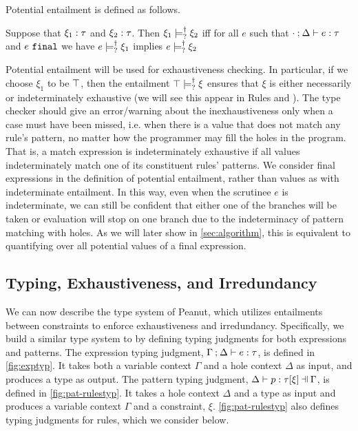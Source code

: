 Potential entailment is defined as follows.
\begin{definition}
  \label{definition:nn-entailment}
  Suppose that $\xi_1 : \tau$ and $\xi_2 : \tau$. Then $\xi_1 \models_{?}^{\dag} \xi_2$ iff for all $e$ such that $\cdot \mathbin{;} \Delta \vdash e : \tau$ and $e ~\mathtt{final}$ we have $e \models_{?}^{\dag} \xi_1$ implies $e \models_{?}^{\dag} \xi_2$ 
\end{definition}
Potential entailment will be used for exhaustiveness checking. In particular, if we choose $\xi_1$ to be $\top$, then the entailment $\top \models_{?}^{\dag} \xi$ ensures that $\xi$ is either necessarily or indeterminately exhaustive (we will see this appear in Rules \TMatchZPre and \TMatchNZPre). 
The type checker should give an error/warning about the inexhaustiveness only when a case must have been missed, i.e. when there is a value that does not match any rule's pattern, no matter how the programmer may fill the holes in the program. That is, a match expression is indeterminately exhaustive if all values indeterminately match one of its constituent rules' patterns.
We consider final expressions in the definition of potential entailment, rather than values as with indeterminate entailment. 
In this way, even when the scrutinee $e$ is indeterminate, we can still be confident that either one of the branches will be taken or evaluation will stop on one branch due to the indeterminacy of pattern matching with holes. As we will later show in \autoref{sec:algorithm}, this is equivalent to quantifying over all potential values of a final expression.


\subsection{Typing, Exhaustiveness, and Irredundancy}\label{sec:statics}



We can now describe the type system of Peanut, which utilizes entailments between constraints to enforce exhaustiveness and irredundancy.
  Specifically, we build a similar type system to
\cite{DBLP:journals/pacmpl/OmarVCH19} by defining typing judgments for both
expressions and patterns. The expression typing judgment, $\Gamma \mathbin{;} \Delta \vdash e : \tau$, is defined in \autoref{fig:exptyp}. It takes both a variable context $\Gamma$ and a hole context $\Delta$ as input, and produces a type as output. The pattern typing judgment, $\chpattyp{p}{\tau}{\xi}{\Gamma}{\Delta}$, is defined in \autoref{fig:pat-rulestyp}. It takes a hole context $\Delta$ and a type as input and produces a variable context $\Gamma$ and a constraint, $\xi$. \autoref{fig:pat-rulestyp} also defines typing judgments for rules, which we consider below.


